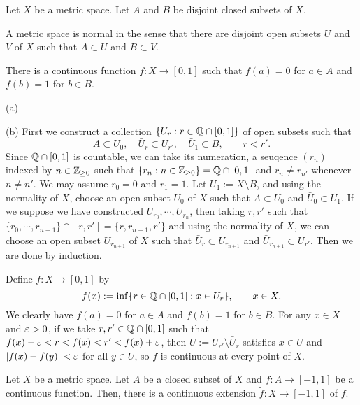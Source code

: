 \documentclass{../../large}
\begin{document}
\begin{prb}
Let $X$ be a metric space.
Let $A$ and $B$ be disjoint closed subsets of $X$.
\begin{parts}
\item A metric space is normal in the sense that there are disjoint open subsets $U$ and $V$ of $X$ such that $A\subset U$ and $B\subset V$.
\item There is a continuous function $f:X\to[0,1]$ such that $f(a)=0$ for $a\in A$ and $f(b)=1$ for $b\in B$.
\end{parts}
\begin{pf}
(a)

(b)
First we construct a collection $\{U_r:r\in\mathbb{Q}\cap[0,1]\}$ of open subsets such that
\[A\subset U_0,\quad\bar U_r\subset U_{r'},\quad\bar U_1\subset B,\qquad r<r'.\]
Since $\mathbb{Q}\cap[0,1]$ is countable, we can take its numeration, a seuqence $(r_n)$ indexed by $n\in\mathbb{Z}_{\ge0}$ such that $\{r_n:n\in\mathbb{Z}_{\ge0}\}=\mathbb{Q}\cap[0,1]$ and $r_n\ne r_{n'}$ whenever $n\ne n'$.
We may assume $r_0=0$ and $r_1=1$.
Let $U_1:=X\setminus B$, and using the normality of $X$, choose an open subset $U_0$ of $X$ such that $A\subset U_0$ and $\bar U_0\subset U_1$.
If we suppose we have constructed $U_{r_0},\cdots,U_{r_n}$, then taking $r,r'$ such that $\{r_0,\cdots,r_{n+1}\}\cap[r,r']=\{r,r_{n+1},r'\}$ and using the normality of $X$, we can choose an open subset $U_{r_{n+1}}$ of $X$ such that $\bar U_r\subset U_{r_{n+1}}$ and $\bar U_{r_{n+1}}\subset U_{r'}$.
Then we are done by induction.

Define $f:X\to[0,1]$ by
\[f(x):=\inf\{r\in\mathbb{Q}\cap[0,1]:x\in U_r\},\qquad x\in X.\]
We clearly have $f(a)=0$ for $a\in A$ and $f(b)=1$ for $b\in B$.
For any $x\in X$ and $\varepsilon>0$, if we take $r,r'\in\mathbb{Q}\cap[0,1]$ such that $f(x)-\varepsilon<r<f(x)<r'<f(x)+\varepsilon$, then $U:=U_{r'}\setminus\bar U_r$ satisfies $x\in U$ and $|f(x)-f(y)|<\varepsilon$ for all $y\in U$, so $f$ is continuous at every point of $X$.
\end{pf}

\end{prb}
\begin{prb}
Let $X$ be a metric space.
Let $A$ be a closed subset of $X$ and $f:A\to[-1,1]$ be a continuous function.
Then, there is a continuous extension $\tilde f:X\to[-1,1]$ of $f$.
\end{prb}
\end{document}
